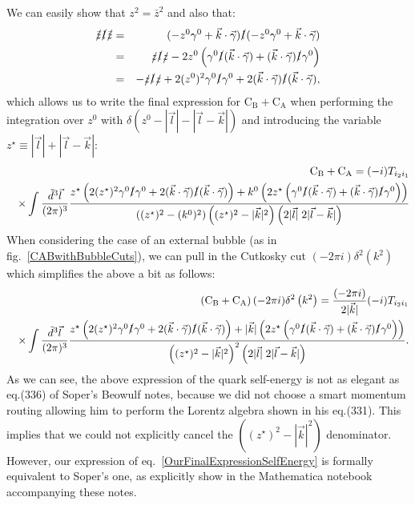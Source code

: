 \documentclass[11pt]{article}
\begin{document}
We can easily show that $z^2=\bar{z}^2$ and also that:
\begin{eqnarray}
\slashed{\bar{z}}\slashed{l}\slashed{\bar{z}}&=&(-z^0\gamma^0+\vec{k} \cdot \vec{\gamma}) \slashed{l} (-z^0\gamma^0+\vec{k} \cdot \vec{\gamma}) \nonumber\\
&=&\slashed{z}\slashed{l}\slashed{z}- 2 z^0\left( \gamma^0 \slashed{l} (\vec{k} \cdot \vec{\gamma}) + (\vec{k} \cdot \vec{\gamma}) \slashed{l} \gamma^0 \right) \nonumber\\
&=&-\slashed{z}\slashed{l}\slashed{z} + 2 (z^0)^2 \gamma^0 \slashed{l} \gamma^0 + 2 (\vec{k} \cdot \vec{\gamma}) \slashed{l} (\vec{k} \cdot \vec{\gamma}),
\end{eqnarray}
which allows us to write the final expression for $\textrm{C}_\textrm{B}+ \textrm{C}_\textrm{A}$ when performing the integration over $z^0$ with $\delta \left(z^0-|\vec{l}|-|\vec{l}-\vec{k}|\right)$ and introducing the variable $z^\star \equiv |\vec{l}|+|\vec{l}-\vec{k}|$:
\begin{eqnarray}
&& \textrm{C}_\textrm{B}+ \textrm{C}_\textrm{A} = (-i)T_{i_2 i_1}  \nonumber\\
&& \times \int \frac{\tilde{d}^3 \vec{l}}{(2\pi)^3}
\frac{
z^\star \left( 2 (z^\star)^2 \gamma^0 \slashed{l} \gamma^0 + 2 (\vec{k} \cdot \vec{\gamma}) \slashed{l} (\vec{k} \cdot \vec{\gamma}) \right) +
k^0 \left (
2 z^\star\left( \gamma^0 \slashed{l} (\vec{k} \cdot \vec{\gamma}) + (\vec{k} \cdot \vec{\gamma}) \slashed{l} \gamma^0 \right)
\right) 
}{
\left( (z^\star)^2-(k^0)^2 \right) \left( (z^\star)^2-|\vec{k}|^2\right) \left( 2 |\vec{l}|\; 2 |\vec{l}-\vec{k}| \right) } \nonumber\\
\end{eqnarray}
When considering the case of an external bubble (as in fig.~\ref{CABwithBubbleCuts}), we can pull in the Cutkosky cut $(-2\pi i)\delta^2\left(k^2\right)$ which simplifies the above a bit as follows:
\begin{eqnarray}
\label{OurFinalExpressionSelfEnergy}
&& \left( \textrm{C}_\textrm{B}+ \textrm{C}_\textrm{A}\right) (-2\pi i)\delta^2\left(k^2\right) = \frac{(-2\pi i)}{2|\vec{k}|}(-i)T_{i_2 i_1}  \nonumber\\
&& \times \int \frac{\tilde{d}^3 \vec{l}}{(2\pi)^3}
\frac{
z^\star \left( 2 (z^\star)^2 \gamma^0 \slashed{l} \gamma^0 + 2 (\vec{k} \cdot \vec{\gamma}) \slashed{l} (\vec{k} \cdot \vec{\gamma}) \right) +
|\vec{k}| \left (
2 z^\star\left( \gamma^0 \slashed{l} (\vec{k} \cdot \vec{\gamma}) + (\vec{k} \cdot \vec{\gamma}) \slashed{l} \gamma^0 \right)
\right) 
}{
\left( (z^\star)^2-|\vec{k}|^2\right)^2 \left( 2 |\vec{l}|\; 2 |\vec{l}-\vec{k}| \right) }. \nonumber\\
\end{eqnarray}
As we can see, the above expression of the quark self-energy is not as elegant as eq.(336) of Soper's Beowulf notes, because we did not choose a smart momentum routing allowing him to perform the Lorentz algebra shown in his eq.(331).
This implies that we could not explicitly cancel the $\left( (z^\star)^2-|\vec{k}|^2\right)$ denominator. 
However, our expression of eq.~\ref{OurFinalExpressionSelfEnergy} is formally equivalent to Soper's one, as explicitly show in the Mathematica notebook accompanying these notes.
\end{document}
